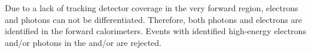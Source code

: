 Due to a lack of tracking detector coverage in the very forward region, electrons and photons can not be differentiated. Therefore, both photons and electrons are identified in the forward calorimeters. Events with identified high-energy electrons and/or photons in the \BeamCAL and/or \LumiCAL are rejected.

